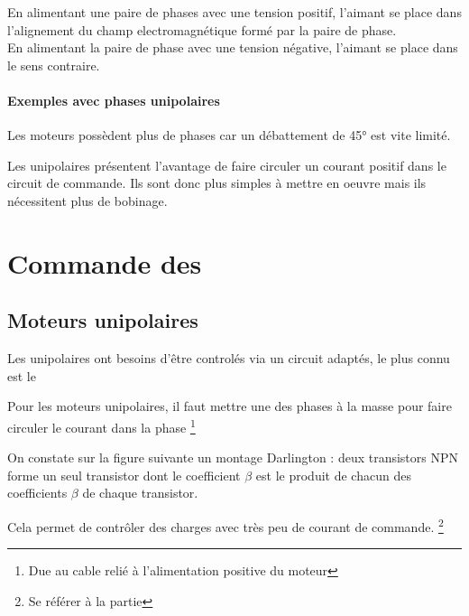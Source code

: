 En alimentant une paire de phases avec une tension positif, l'aimant se place dans l'alignement du champ electromagnétique formé par la paire de phase.\\
En alimentant la paire de phase avec une tension négative, l'aimant se place dans le sens contraire.\\



\subsubsection{Exemples avec phases unipolaires}


Les moteurs possèdent plus de phases car un débattement de 45° est vite limité.

Les \pap unipolaires présentent l'avantage de faire circuler un courant positif dans le circuit de commande. Ils sont donc plus simples à mettre en oeuvre mais ils nécessitent plus de bobinage.


\chapter{Commande des \paps}

\section{Moteurs unipolaires}
Les \pap unipolaires ont besoins d'être controlés via un circuit adaptés, le plus connu est le 



Pour les moteurs unipolaires, il faut mettre une des phases à la masse pour faire circuler le courant dans la phase \footnote{Due au cable relié à l'alimentation positive du moteur}

On constate sur la figure suivante un montage Darlington : deux transistors NPN forme un seul transistor dont le coefficient $\beta$ est le produit de chacun des coefficients $\beta$ de chaque transistor.

Cela permet de contrôler des charges avec très peu de courant de commande. \footnote{Se référer à la partie }

